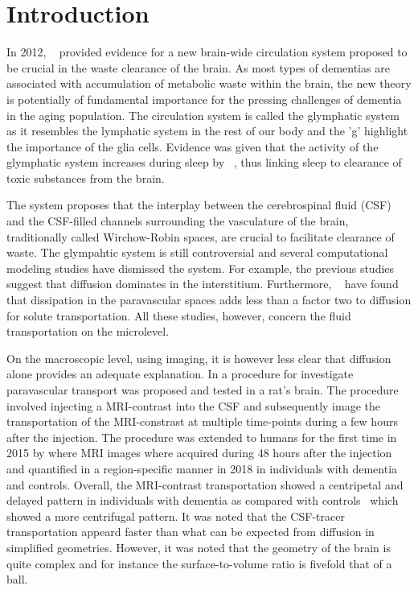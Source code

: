 \documentclass[12pt,a4paper]{article}
\begin{document}
\section{Introduction}
In 2012, ~\citet{iliff2012paravascular} provided evidence for a new brain-wide circulation system proposed to be crucial in the waste clearance of the brain. As most types
of dementias are associated with accumulation of metabolic waste within the brain, the new theory is potentially of fundamental importance for
the pressing challenges of dementia in the aging population. The circulation system is called the glymphatic system as it resembles the lymphatic system in the 
rest of our body and the 'g' highlight the importance of the glia cells. Evidence was given that the activity of the glymphatic system increases during  sleep by ~\citet{xie2013sleep}, thus linking sleep to clearance of toxic substances from the brain. 

The system proposes that 
the interplay between the cerebrospinal fluid (CSF) and the CSF-filled channels surrounding the vasculature of the brain, traditionally called Wirchow-Robin spaces, are crucial to  
facilitate clearance of waste.  
The glympahtic system is still controversial and several computational modeling studies have dismissed the system.  
For example, the previous studies~\cite{holter2017interstitial, smith2017glymphatic} suggest that diffusion dominates in the interstitium. Furthermore, ~\cite{asgari2016glymphatic, brynjfm, Diem} have found that dissipation in the paravascular spaces adds less than a factor two to diffusion for solute transportation. All these studies, however, concern the fluid transportation on the microlevel. 

On the macroscopic level, using imaging, it is however less clear that diffusion alone provides an adequate explanation. 
In \cite{iliff2013brain} a procedure for  investigate paravascular transport was proposed  and tested in a rat's brain. The procedure involved injecting a 
MRI-contrast into the CSF and subsequently image the transportation of the MRI-constrast at multiple time-points during a few hours after the injection.  
The procedure was extended to humans for the first time 
in 2015 by \citet{eide2015mri} where MRI images where acquired during 48 hours after the injection and quantified in a region-specific manner in 2018 \citet{ringstad2018brain} in individuals with dementia and controls. Overall, the MRI-contrast transportation  showed a centripetal and delayed pattern in individuals with dementia as compared with controls~\citet{ringstad2018brain} which showed a more centrifugal pattern. It was noted that the CSF-tracer transportation appeard faster than what can be expected from diffusion in simplified geometries. However, it was noted that the geometry of
the brain is quite complex and for instance the surface-to-volume ratio is fivefold that of a ball. 
\end{document}
